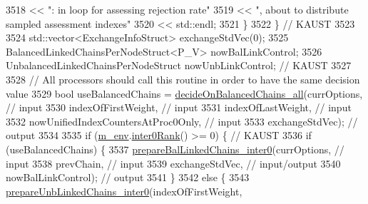 \begin{DoxyCode}
3518                                     << \textcolor{stringliteral}{": in loop for assessing rejection rate"}
3519                                     << \textcolor{stringliteral}{", about to distribute sampled assessment indexes"}
3520                                     << std::endl;
3521           \}
3522         \} \textcolor{comment}{// KAUST}
3523 
3524         std::vector<ExchangeInfoStruct>        exchangeStdVec(0);
3525         BalancedLinkedChainsPerNodeStruct<P\_V> nowBalLinkControl;
3526         UnbalancedLinkedChainsPerNodeStruct    nowUnbLinkControl; \textcolor{comment}{// KAUST}
3527 
3528         \textcolor{comment}{// All processors should call this routine in order to have the same decision value}
3529         \textcolor{keywordtype}{bool} useBalancedChains = \hyperlink{class_q_u_e_s_o_1_1_m_l_sampling_a0f6f7872635b9546b3215fee347601f6}{decideOnBalancedChains\_all}(currOptions,         
                     \textcolor{comment}{// input}
3530                                                             indexOfFirstWeight,                 \textcolor{comment}{// input}
3531                                                             indexOfLastWeight,                  \textcolor{comment}{// input}
3532                                                             nowUnifiedIndexCountersAtProc0Only, \textcolor{comment}{// input}
3533                                                             exchangeStdVec);                    \textcolor{comment}{// output}
3534 
3535         \textcolor{keywordflow}{if} (\hyperlink{class_q_u_e_s_o_1_1_m_l_sampling_a13f1ca4fe9f94822fe572a743eaced1d}{m\_env}.\hyperlink{class_q_u_e_s_o_1_1_base_environment_ae106b5bb8a80b655b88b3a26b1e7c185}{inter0Rank}() >= 0) \{ \textcolor{comment}{// KAUST}
3536           \textcolor{keywordflow}{if} (useBalancedChains) \{
3537             \hyperlink{class_q_u_e_s_o_1_1_m_l_sampling_a75b2d73a0b07f594951a89cc1bc96849}{prepareBalLinkedChains\_inter0}(currOptions,                        \textcolor{comment}{
      // input}
3538                                           prevChain,                          \textcolor{comment}{// input}
3539                                           exchangeStdVec,                     \textcolor{comment}{// input/output}
3540                                           nowBalLinkControl);                 \textcolor{comment}{// output}
3541           \}
3542           \textcolor{keywordflow}{else} \{
3543             \hyperlink{class_q_u_e_s_o_1_1_m_l_sampling_a37dcf4d893b6c8f67fe077892bada773}{prepareUnbLinkedChains\_inter0}(indexOfFirstWeight,                 \textcolor{comment}{
}
\end{DoxyCode}
